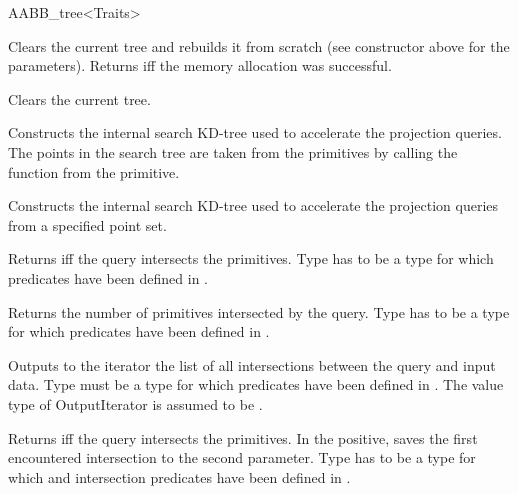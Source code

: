 \begin{ccRefClass}{AABB_tree<Traits>}
\ccOperations

{Clears the current tree and rebuilds it from scratch (see constructor  above for the parameters). Returns  iff the memory allocation was successful. }

{Clears the current tree. }


{ Constructs the internal search KD-tree used to accelerate the projection queries. The points in the search tree are taken from the primitives by calling the function  from the primitive.}

{ Constructs the internal search KD-tree used to accelerate the projection queries from a specified point set. }


{ Returns  iff the query intersects the primitives. Type  has to be a type for which  predicates have been defined in .}
	
{Returns the number of primitives intersected by the query. Type  has to be a type for which  predicates have been defined in .}
	
{Outputs to the iterator the list of all intersections between the query and input data. Type  must be a type for which  predicates have been defined in . The value type of OutputIterator is assumed to be .}

{Returns  iff the query intersects the primitives. In the positive, saves the first encountered intersection to the second parameter. Type  has to be a type for which  and intersection predicates have been defined in .}


\end{ccRefClass}
